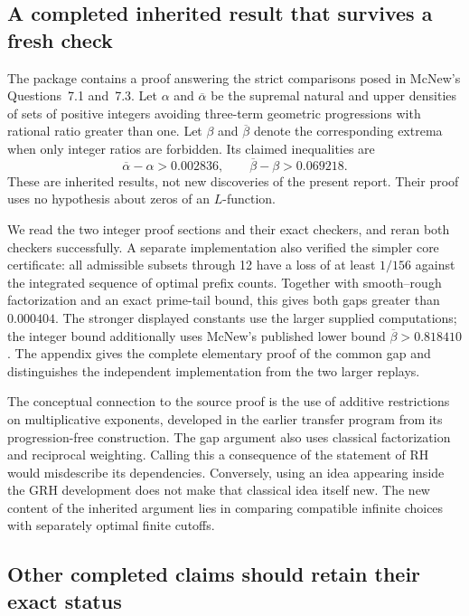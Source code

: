 \subsection{A completed inherited result that survives a fresh check}

The package
contains a proof answering the strict comparisons posed in McNew's
Questions~7.1 and~7.3. Let $\alpha$ and $\overline\alpha$ be the supremal
natural and upper densities of sets of positive integers avoiding
three-term geometric progressions with rational ratio greater than one.
Let $\beta$ and $\overline\beta$ denote the corresponding extrema when
only integer ratios are forbidden. Its claimed inequalities are
\[
 \overline\alpha-\alpha>0.002836,
 \qquad
 \overline\beta-\beta>0.069218.
\]
These are inherited results, not new discoveries of the present report.
Their proof uses no hypothesis about zeros of an $L$-function.
\cite{priordensity,mcnew2015}

We read the two integer proof sections and their exact checkers, and reran
both checkers successfully. A separate implementation also verified the
simpler core certificate: all admissible subsets through 12 have a loss
of at least $1/156$ against the integrated sequence of optimal prefix
counts. Together with smooth--rough factorization and an exact prime-tail
bound, this gives both gaps greater than $0.000404$.
The stronger displayed constants use the larger supplied computations;
the integer bound additionally uses McNew's published lower bound
$\overline\beta>0.818410$. The appendix gives the complete elementary
proof of the common gap and distinguishes the independent implementation
from the two larger replays.\cite{priordensity,mcnew2015}

The conceptual connection to the source proof is the use of additive
restrictions on multiplicative exponents, developed in the earlier
transfer program from its progression-free construction. The gap argument
also uses classical factorization and reciprocal weighting. Calling this
a consequence of the statement of RH would misdescribe its dependencies.
Conversely, using an idea appearing inside the GRH development does not
make that classical idea itself new. The new content of the inherited
argument lies in comparing compatible infinite choices with separately
optimal finite cutoffs.\cite{priordensity}

\subsection{Other completed claims should retain their exact status}

